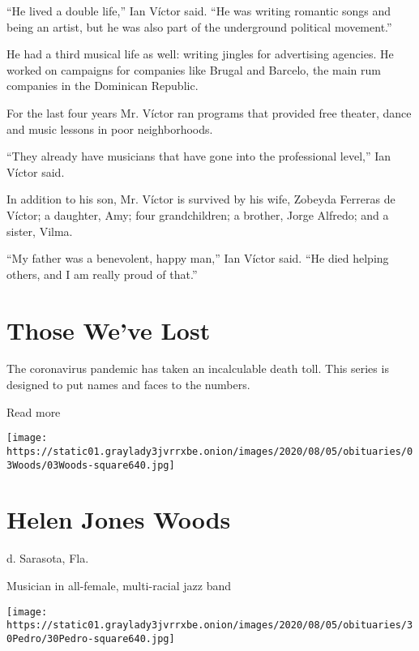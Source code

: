 ``He lived a double life,'' Ian Víctor said. ``He was writing romantic
songs and being an artist, but he was also part of the underground
political movement.''

He had a third musical life as well: writing jingles for advertising
agencies. He worked on campaigns for companies like Brugal and Barcelo,
the main rum companies in the Dominican Republic.

For the last four years Mr. Víctor ran programs that provided free
theater, dance and music lessons in poor neighborhoods.

``They already have musicians that have gone into the professional
level,'' Ian Víctor said.

In addition to his son, Mr. Víctor is survived by his wife, Zobeyda
Ferreras de Víctor; a daughter, Amy; four grandchildren; a brother,
Jorge Alfredo; and a sister, Vilma.

``My father was a benevolent, happy man,'' Ian Víctor said. ``He died
helping others, and I am really proud of that.''

\href{https://www.nytimes3xbfgragh.onion/interactive/2020/obituaries/people-died-coronavirus-obituaries.html?action=click\&pgtype=Article\&state=default\&region=BELOW_MAIN_CONTENT\&context=covid_obits_promo}{}

\hypertarget{those-weve-lost}{%
\section{Those We've Lost}\label{those-weve-lost}}

The coronavirus pandemic has taken an incalculable death toll. This
series is designed to put names and faces to the numbers.

Read more

\texttt{[image: https://static01.graylady3jvrrxbe.onion/images/2020/08/05/obituaries/03Woods/03Woods-square640.jpg]}

\hypertarget{helen-jones-woods}{%
\section{Helen Jones Woods}\label{helen-jones-woods}}

d. Sarasota, Fla.

Musician in all-female, multi-racial jazz band

\texttt{[image: https://static01.graylady3jvrrxbe.onion/images/2020/08/05/obituaries/30Pedro/30Pedro-square640.jpg]}

